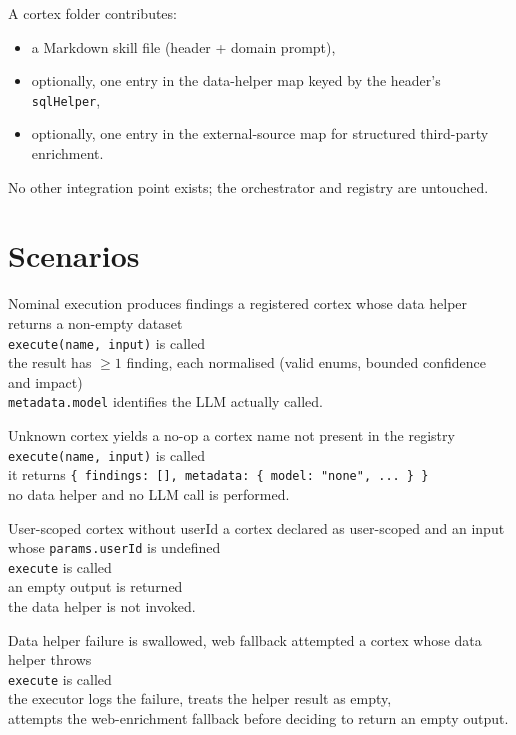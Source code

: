 A cortex folder contributes:
\begin{itemize}[leftmargin=1.2em]
  \item a Markdown skill file (header + domain prompt),
  \item optionally, one entry in the data-helper map keyed by the header's \texttt{sqlHelper},
  \item optionally, one entry in the external-source map for structured third-party enrichment.
\end{itemize}
No other integration point exists; the orchestrator and registry are untouched.

\section{Scenarios}

\begin{scenario}{Nominal execution produces findings}
\Given a registered cortex whose data helper returns a non-empty dataset \\
\When \texttt{execute(name, input)} is called \\
\Then the result has $\geq 1$ finding, each normalised (valid enums, bounded confidence and impact) \\
\And \texttt{metadata.model} identifies the LLM actually called.
\end{scenario}

\begin{scenario}{Unknown cortex yields a no-op}
\Given a cortex name not present in the registry \\
\When \texttt{execute(name, input)} is called \\
\Then it returns \texttt{\{ findings: [], metadata: \{ model: "none", ... \} \}} \\
\And no data helper and no LLM call is performed.
\end{scenario}

\begin{scenario}{User-scoped cortex without userId}
\Given a cortex declared as user-scoped and an input whose \texttt{params.userId} is undefined \\
\When \texttt{execute} is called \\
\Then an empty output is returned \\
\And the data helper is not invoked.
\end{scenario}

\begin{scenario}{Data helper failure is swallowed, web fallback attempted}
\Given a cortex whose data helper throws \\
\When \texttt{execute} is called \\
\Then the executor logs the failure, treats the helper result as empty, \\
\And attempts the web-enrichment fallback before deciding to return an empty output.
\end{scenario}

